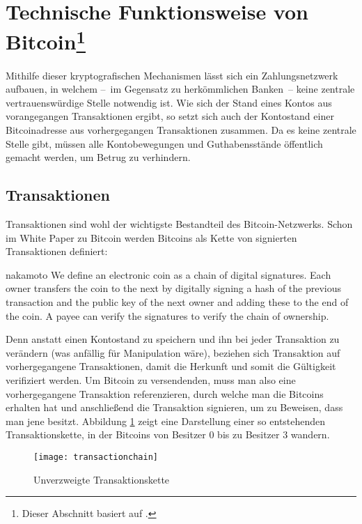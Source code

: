 \section[Technische Funktionsweise von Bitcoin]{Technische Funktionsweise von Bitcoin\footnote{Dieser Abschnitt basiert auf \cite{nielsen}.}}
\label{sec:mechanics}

Mithilfe dieser kryptografischen Mechanismen lässt sich ein Zahlungsnetzwerk aufbauen, in welchem --~im Gegensatz zu herkömmlichen Banken~-- keine zentrale vertrauenswürdige Stelle notwendig ist.
Wie sich der Stand eines Kontos aus vorangegangen Transaktionen ergibt, so setzt sich auch der Kontostand einer Bitcoinadresse aus vorhergegangen Transaktionen zusammen.
Da es keine zentrale Stelle gibt, müssen alle Kontobewegungen und Guthabensstände öffentlich gemacht werden, um Betrug zu verhindern.

\subsection{Transaktionen}

Transaktionen sind wohl der wichtigste Bestandteil des Bitcoin-Netzwerks.
Schon im White Paper zu Bitcoin werden Bitcoins als Kette von signierten Transaktionen definiert:

\begin{longquote}[2]{nakamoto}
We define an electronic coin as a chain of digital signatures. Each owner transfers the coin to the next by digitally signing a hash of the previous transaction and the public key of the next owner and adding these to the end of the coin. A payee can verify the signatures to verify the chain of ownership.
\end{longquote}

Denn anstatt einen Kontostand zu speichern und ihn bei jeder Transaktion zu verändern (was anfällig für Manipulation wäre), beziehen sich Transaktion auf vorhergegangene Transaktionen, damit die Herkunft und somit die Gültigkeit verifiziert werden.
Um Bitcoin zu versendenden, muss man also eine vorhergegangene Transaktion referenzieren, durch welche man die Bitcoins erhalten hat und anschließend die Transaktion signieren, um zu Beweisen, dass man jene besitzt.
Abbildung \ref{fig:transactionchain} zeigt eine Darstellung einer so entstehenden Transaktionskette, in der Bitcoins von Besitzer 0 bis zu Besitzer 3 wandern.

\begin{figure}[htb]
    \begin{center}
        \texttt{[image: transactionchain]}
        \caption{Unverzweigte Transaktionskette \parencite[2]{nakamoto}}
        \label{fig:transactionchain}
    \end{center}
\end{figure}

